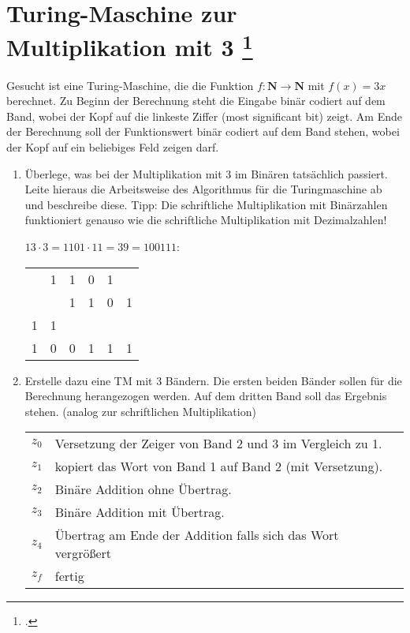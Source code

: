 \documentclass{lehramt-informatik-aufgabe}
\begin{document}
\section{Turing-Maschine zur Multiplikation mit 3
\footcite[Aufgabe 5]{theo:ab:3}}

Gesucht ist eine Turing-Maschine, die die Funktion $f : \mathbf{N}
\rightarrow \mathbf{N}$ mit $f(x) = 3x$ berechnet. Zu Beginn der
Berechnung steht die Eingabe binär codiert auf dem Band, wobei der Kopf
auf die linkeste Ziffer (most significant bit) zeigt. Am Ende der
Berechnung soll der Funktionswert binär codiert auf dem Band stehen,
wobei der Kopf auf ein beliebiges Feld zeigen darf.

\begin{enumerate}


\item Überlege, was bei der Multiplikation mit 3 im Binären tatsächlich
passiert. Leite hieraus die Arbeitsweise des Algorithmus für die
Turingmaschine ab und beschreibe diese. Tipp: Die schriftliche
Multiplikation mit Binärzahlen funktioniert genauso wie die schriftliche
Multiplikation mit Dezimalzahlen!

\begin{liAntwort}

$13 \cdot 3 = 1101 \cdot 11 = 39 = 100111$:

\begin{center}
\begin{tabular}{llllll}
  & 1 & 1 & 0 & 1 &   \\
  &   & 1 & 1 & 0 & 1 \\
{\tiny 1} & {\tiny 1} &   &   &   &   \\\hline
1 & 0 & 0 & 1 & 1 & 1
\end{tabular}
\end{center}
\end{liAntwort}


\item Erstelle dazu eine TM mit 3 Bändern. Die ersten beiden Bänder
sollen für die Berechnung herangezogen werden. Auf dem dritten Band soll
das Ergebnis stehen. (analog zur schriftlichen Multiplikation)

\begin{liAntwort}
\begin{tabular}{ll}
$z_0$ & Versetzung der Zeiger von Band 2 und 3 im Vergleich zu 1. \\
$z_1$ & kopiert das Wort von Band 1 auf Band 2 (mit Versetzung). \\
$z_2$ & Binäre Addition ohne Übertrag. \\
$z_3$ & Binäre Addition mit Übertrag. \\
$z_4$ & Übertrag am Ende der Addition falls sich das Wort vergrößert \\
$z_f$ & fertig \\
\end{tabular}


\end{liAntwort}
\end{enumerate}
\end{document}
